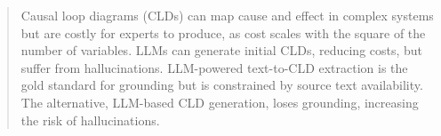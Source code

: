 \renewcommand{\abstractname}{Extended Abstract}
\begin{abstract}

%

Causal loop diagrams (CLDs) can map cause and effect in complex systems but are costly for experts to produce, as cost scales with the square of the number of variables. LLMs can generate initial CLDs, reducing costs, but suffer from hallucinations. LLM-powered text-to-CLD extraction is the gold standard for grounding but is constrained by source text availability. The alternative, LLM-based CLD generation, loses grounding, increasing the risk of hallucinations.


\end{abstract}
